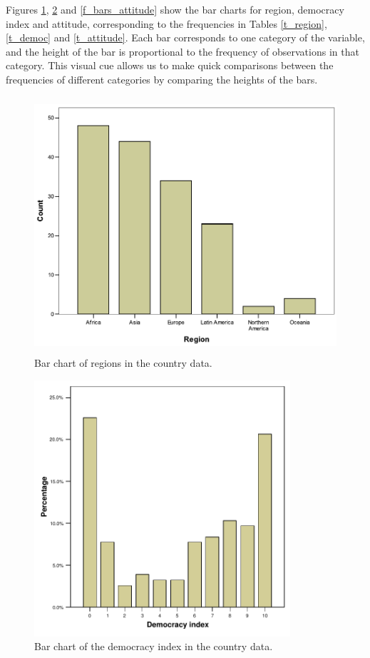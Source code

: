 Figures \ref{f_bars_region}, \ref{f_bars_democ} and \ref{f_bars_attitude} show
the bar charts for region, democracy index and attitude, corresponding
to the frequencies in Tables \ref{t_region}, \ref{t_democ} and
\ref{t_attitude}. Each bar corresponds to one category of the variable, and
the height of the bar is proportional to the frequency of observations
in that category. This visual cue allows us to make quick comparisons
between the frequencies of different categories by comparing the heights
of the bars.

\begin{figure}[p]
\caption{Bar chart of regions in the country data.}
\label{f_bars_region}
\begin{center}
\includegraphics[height=9.5cm]{regions}
\end{center}
\end{figure}

\begin{figure}[p]
\caption{Bar chart of the democracy index in the country data.}
\label{f_bars_democ}
\begin{center}
\includegraphics[height=9.5cm]{democ}
\end{center}
\end{figure}

